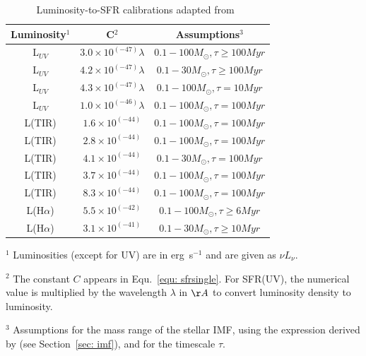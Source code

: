 \begin{center}
\begin{table}
\caption{Luminosity-to-SFR calibrations adapted from~\cite{Calzetti13}}
\label{table1}
\begin{tabular}{ c c c }
\hline\hline
Luminosity$^1$ & C$^2$ & Assumptions$^3$\\
\hline
L$_{UV}$ & $3.0 \times 10^{(-47)} \lambda$ &$0.1 -100 M_{\odot}, \tau \ge 100 Myr $\\
L$_{UV}$ & $4.2 \times 10^{(-47)} \lambda$ &$0.1 -30 M_{\odot}, \tau \ge 100 Myr $\\
L$_{UV}$ & $4.3 \times 10^{(-47)}\lambda$ &$0.1 -100 M_{\odot}, \tau = 10 Myr $\\
L$_{UV}$ & $1.0 \times 10^{(-46)}\lambda$ &$0.1 -100 M_{\odot}, \tau = 100 Myr $\\
L(TIR) & $1.6 \times 10^{(-44)}$ &$0.1 -100 M_{\odot}, \tau = 100 Myr $\\
L(TIR) & $2.8 \times 10^{(-44)}$ &$0.1 -100 M_{\odot}, \tau = 100 Myr $\\
L(TIR) & $4.1 \times 10^{(-44)}$ &$0.1 -30 M_{\odot}, \tau = 100 Myr $\\
L(TIR) & $3.7 \times 10^{(-44)}$ &$0.1 -100 M_{\odot}, \tau = 100 Myr $\\
L(TIR) & $8.3 \times 10^{(-44)}$ &$0.1 -100 M_{\odot}, \tau = 100 Myr $\\
L(H${\alpha}$) & $5.5 \times 10^{(-42)}$&$0.1 -100 M_{\odot},  \tau \ge 6 Myr $\\
L(H${\alpha}$) & $3.1 \times 10^{(-41)}$&$0.1 -30 M_{\odot},  \tau \ge 10 Myr $\\
\hline
\end{tabular}
\begin{tablenotes}
\item $^1$ Luminosities (except for UV) are in erg~s$^{-1}$ and are given as $\nu L_{\nu}$.
\item $^2$ The constant $C$ appears in Equ.~\ref{equ: sfrsingle}. For SFR(UV), the numerical value is multiplied by the wavelength $\lambda$ in $\AA$ to convert luminosity density to luminosity. %
\item $^3$ Assumptions for the mass range of the stellar IMF, using the expression derived by \cite{Kroupa01} (see Section~\ref{sec: imf}), and for the timescale $\tau$.
\end{tablenotes}
\end{table}
\end{center}

